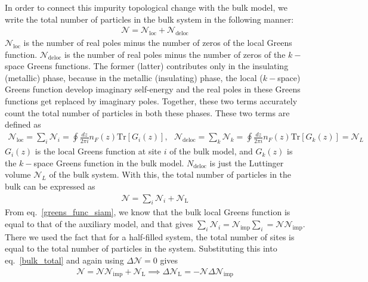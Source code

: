 \documentclass{report}
\numberwithin{equation}{section}
\begin{document}
In order to connect this impurity topological change with the bulk model, we write the total number of particles in the bulk system in the following manner:
\begin{equation}\begin{aligned}
	\mathcal{N} = \mathcal{N}_\text{loc} + \mathcal{N}_\text{deloc}
\end{aligned}\end{equation}
\(\mathcal{N}_\text{loc}\) is the number of real poles minus the number of zeros of the local Greens function. \(\mathcal{N}_\text{deloc}\) is the number of real poles minus the number of zeros of the \(k-\)space Greens functions. The former (latter) contributes only in the insulating (metallic) phase, because in the metallic (insulating) phase, the local (\(k-\)space) Greens function develop imaginary self-energy and the real poles in these Greens functions get replaced by imaginary poles. Together, these two terms accurately count the total number of particles in both these phases. These two terms are defined as
\begin{equation}\begin{aligned}
	\mathcal{N}_\text{loc} = \sum_i \mathcal{N}_i = \oint \frac{dz}{2\pi i}n_F(z) \text{Tr}\left[G_i(z)\right], ~ ~ ~\mathcal{N}_\text{deloc} = \sum_k \mathcal{N}_k = \oint \frac{dz}{2\pi i}n_F(z) \text{Tr}\left[G_k(z)\right] = \mathcal{N}_L
\end{aligned}\end{equation}
\(G_i(z)\) is the local Greens function at site \(i\) of the bulk model, and \(G_k(z)\) is the \(k-\)space Greens function in the bulk model. \(N_\text{deloc}\) is just the Luttinger volume \(\mathcal{N}_L\) of the bulk system. With this, the total number of particles in the bulk can be expressed as
\begin{equation}\begin{aligned}
	\label{bulk_total}
	\mathcal{N} = \sum_i \mathcal{N}_i + \mathcal{N}_\text{L}
\end{aligned}\end{equation}
From eq.~\ref{greens_func_siam}, we know that the bulk local Greens function is equal to that of the auxiliary model, and that gives \(\sum_i \mathcal{N}_i = \mathcal{N}_\text{imp}\sum_i = \mathcal{N} \mathcal{N}_\text{imp}\). There we used the fact that for a half-filled system, the total number of sites is equal to the total number of particles in the system. Substituting this into eq.~\ref{bulk_total} and again using \(\Delta \mathcal{N} = 0\) gives
\begin{equation}\begin{aligned}
	\mathcal{N} = \mathcal{N} \mathcal{N}_\text{imp} + \mathcal{N}_\text{L} \implies \Delta \mathcal{N}_\text{L} = - \mathcal{N} \Delta \mathcal{N}_\text{imp}
\end{aligned}\end{equation}
\end{document}
